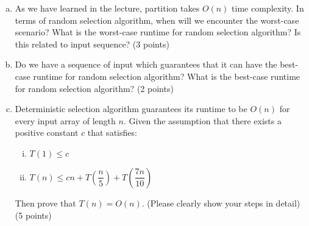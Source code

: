 \documentclass[11pt]{exam}
\begin{document}
\begin{enumerate}[(a)]
\item As we have learned in the lecture, partition takes $O(n)$ time complexity. In terms of random selection algorithm, when will we encounter the worst-case scenario? What is the worst-case runtime for random selection algorithm? Is this related to input sequence? (3 points)

\item Do we have a sequence of input which guarantees that it can have the best-case runtime for random selection algorithm? What is the best-case runtime for random selection algorithm? (2 points)

\item Deterministic selection algorithm guarantees its runtime to be $O(n)$ for every input array of length $n$. Given the assumption that there exists a positive constant $c$ that satisfies:
\begin{enumerate}[i)]
\item $T(1)\leq c$
\item $T(n) \leq cn + T\left(\dfrac{n}{5}\right) +  T\left(\dfrac{7n}{10}\right)$
\end{enumerate}

Then prove that $T(n) = O(n)$. (Please clearly show your steps in detail) (5 points)
\end{enumerate}
\end{document}
